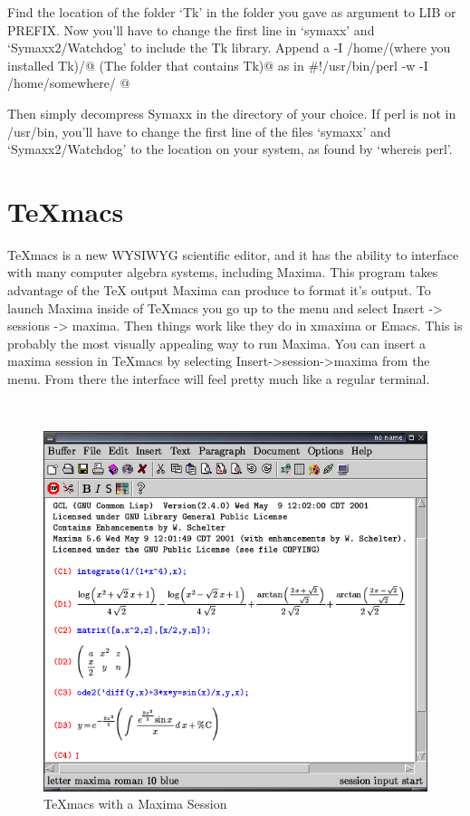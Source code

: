 Find the location of the folder `Tk' in the folder you gave as argument to LIB or
PREFIX. Now you'll have to change the first line in `symaxx' and `Symaxx2/Watchdog'
to include the Tk library. Append a
\verb@-I /home/(where you installed Tk)/@ \verb@(The folder that contains Tk)@
as in
\verb@ #!/usr/bin/perl -w -I /home/somewhere/ @

Then simply decompress Symaxx in the directory of your choice. If perl is not in /usr/bin, you'll have to change the first line of the files `symaxx'
and `Symaxx2/Watchdog' to the location on your system, as found by `whereis
perl'.

\section{\TeX{}macs}

\TeX{}macs is a new WYSIWYG scientific editor, and it has the ability
to interface with many computer algebra systems, including Maxima.
This program takes advantage of the \TeX{} output Maxima can produce
to format it's output. To launch Maxima inside of \TeX{}macs you go
up to the menu and select Insert -> sessions -> maxima. Then things
work like they do in xmaxima or Emacs. This is probably the most visually
appealing way to run Maxima.  You can insert a maxima session in TeXmacs by
selecting Insert->session->maxima from the menu.  From there the interface
will feel pretty much like a regular terminal.

~

\begin{figure}
\centering \includegraphics{images/texmacs} 
\caption{TeXmacs with a Maxima Session} 
\end{figure}
